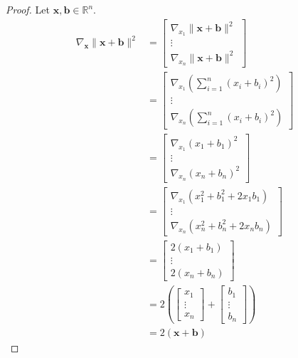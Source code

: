 \documentclass{article}
\theoremstyle{plain}
\begin{document}
\begin{proof}
	Let
	\begin{math}
		\bm{x} , \bm{b} \in \mathbb{R}^n .
	\end{math}
	\begin{equation*}
		\begin{split}
			\nabla_{\bm{x}} \lVert \bm{x} + \bm{b} \rVert^2 &=
			\begin{bmatrix}
				\nabla_{x_1} \lVert \bm{x} + \bm{b} \rVert^2 \\
				\vdots \\
				\nabla_{x_n} \lVert \bm{x} + \bm{b} \rVert^2
			\end{bmatrix} \\
			&=
			\begin{bmatrix}
				\nabla_{x_1} \left( \sum_{i=1}^n (x_i + b_i)^2 \right) \\
				\vdots \\
				\nabla_{x_n} \left( \sum_{i=1}^n (x_i + b_i)^2 \right)
			\end{bmatrix} \\
			&=
			\begin{bmatrix}
				\nabla_{x_1} (x_1 + b_1)^2 \\
				\vdots \\
				\nabla_{x_n} (x_n + b_n)^2
			\end{bmatrix} \\
			&=
			\begin{bmatrix}
				\nabla_{x_1} (x_1^2 + b_1^2 + 2 x_1 b_1) \\
				\vdots \\
				\nabla_{x_n} (x_n^2 + b_n^2 + 2 x_n b_n)
			\end{bmatrix} \\
			&=
			\begin{bmatrix}
				2 (x_1 + b_1) \\
				\vdots \\
				2 (x_n + b_n)
			\end{bmatrix} \\
			&= 2 \left(
			\begin{bmatrix}
				x_1 \\
				\vdots \\
				x_n
			\end{bmatrix}
			+
			\begin{bmatrix}
				b_1 \\
				\vdots \\
				b_n
			\end{bmatrix} \right) \\
			&=
			2(\bm{x} + \bm{b})
		\end{split}
	\end{equation*}
\end{proof}
\end{document}
